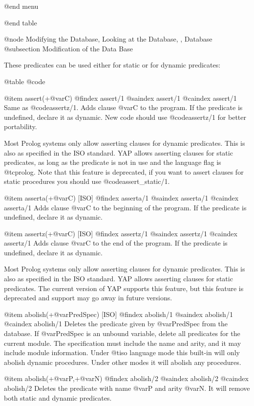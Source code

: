 {{{{{@end menu

@end table

@node Modifying the Database, Looking at the Database, , Database
@subsection Modification of the Data Base

These predicates can be used either for static or for dynamic
predicates:

@table @code

@item assert(+@var{C})
@findex assert/1
@saindex assert/1
@caindex assert/1
 Same as @code{assertz/1}. Adds clause @var{C} to the program. If the predicate is undefined,
declare it as dynamic. New code should use @code{assertz/1} for better portability.

 Most Prolog systems only allow asserting clauses for dynamic
predicates. This is also as specified in the ISO standard. YAP allows
asserting clauses for static predicates, as long as the predicate is not
in use and the language flag is @t{cprolog}. Note that this feature is
deprecated, if you want to assert clauses for static procedures you
should use @code{assert_static/1}.

@item asserta(+@var{C}) [ISO]
@findex asserta/1
@saindex asserta/1
@caindex asserta/1
 Adds clause @var{C} to the beginning of the program. If the predicate is
undefined, declare it as dynamic.

@item assertz(+@var{C}) [ISO]
@findex assertz/1
@saindex assertz/1
@caindex assertz/1
 Adds clause @var{C} to the end of the program. If the predicate is
undefined, declare it as dynamic.

 Most Prolog systems only allow asserting clauses for dynamic
predicates. This is also as specified in the ISO standard. YAP allows
asserting clauses for static predicates. The current version of YAP
supports this feature, but this feature is deprecated and support may go
away in future versions.

@item abolish(+@var{PredSpec}) [ISO]
@findex abolish/1
@saindex abolish/1
@caindex abolish/1
   Deletes the predicate given by @var{PredSpec} from the database. If
@var{PredSpec} is an unbound variable, delete all predicates for the
current module. The
specification must include the name and arity, and it may include module
information. Under @t{iso} language mode this built-in will only abolish
dynamic procedures. Under other modes it will abolish any procedures. 

@item abolish(+@var{P},+@var{N})
@findex abolish/2
@saindex abolish/2
@caindex abolish/2
 Deletes the predicate with name @var{P} and arity @var{N}. It will remove
both static and dynamic predicates.

}}}}}

